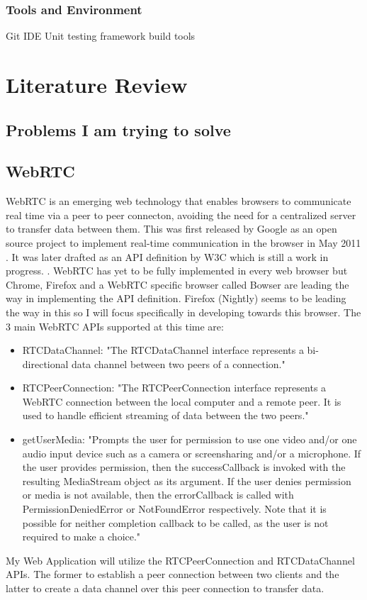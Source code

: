 \documentclass[]{report}
\begin{document}
		\subsubsection*{Tools and Environment}
		Git
		IDE
		Unit testing framework
		build tools

	\section{Literature Review}
		\subsection*{Problems I am trying to solve}
		\subsection*{WebRTC}
		WebRTC is an emerging web technology that enables browsers to communicate real time via a peer to peer connecton, avoiding the need for a centralized server to transfer data between them. This was first released by Google as an open source project to implement real-time communication in the browser in May 2011 \cite{Google WebRTC Release}. It was later drafted as an API definition by W3C which is still a work in progress. \cite{W3C WebRTC Definition}. WebRTC has yet to be fully implemented in every web browser but Chrome, Firefox and a WebRTC specific browser called Bowser are leading the way in implementing the API definition. Firefox (Nightly) seems to be leading the way in this so I will focus specifically in developing towards this browser\cite{WebRTC browser support}.
		The 3 main WebRTC APIs supported at this time are:
		\begin{itemize}
			\item RTCDataChannel:
			"The RTCDataChannel interface represents a bi-directional data channel between two peers of a connection." \cite{Mozilla Web API}
			\item RTCPeerConnection:
			"The RTCPeerConnection interface represents a WebRTC connection between the local computer and a remote peer. It is used to handle efficient streaming of data between the two peers." 
			\cite{Mozilla Web API}
			\item getUserMedia:
			"Prompts the user for permission to use one video and/or one audio input device such as a camera or screensharing and/or a microphone. If the user provides permission, then the successCallback is invoked with the resulting MediaStream object as its argument. If the user denies permission or media is not available, then the errorCallback is called with PermissionDeniedError or NotFoundError respectively. Note that it is possible for neither completion callback to be called, as the user is not required to make a choice."
			\cite{Mozilla Web API}
		\end{itemize}
			My Web Application will utilize the RTCPeerConnection and RTCDataChannel APIs. The former to establish a peer connection between two clients and the latter to create a data channel over this peer connection to transfer data.
			
\end{document}

